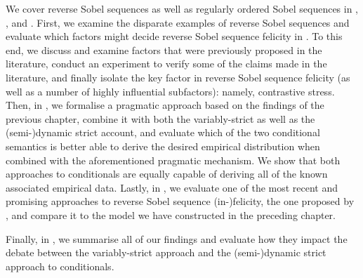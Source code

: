 We cover reverse Sobel sequences as well as regularly ordered Sobel sequences in , , and . First, we examine the disparate examples of reverse Sobel sequences and evaluate which factors might decide reverse Sobel sequence felicity in . To this end, we discuss and examine factors that were previously proposed in the literature, conduct an experiment to verify some of the claims made in the literature, and finally isolate the key factor in reverse Sobel sequence felicity (as well as a number of highly influential subfactors): namely, contrastive stress. Then, in , we formalise a pragmatic approach based on the findings of the previous chapter, combine it with both the variably-strict as well as the (semi-)dynamic strict account, and evaluate which of the two conditional semantics is better able to derive the desired empirical distribution when combined with the aforementioned pragmatic mechanism. We show that both approaches to conditionals are equally capable of deriving all of the known associated empirical data. Lastly, in , we evaluate one of the most recent and promising approaches to reverse Sobel sequence (in-)felicity, the one proposed by \textcite{Ippolito2020}, and compare it to the model we have constructed in the preceding chapter.

Finally, in , we summarise all of our findings and evaluate how they impact the debate between the variably-strict approach and the (semi-)dynamic strict approach to conditionals.